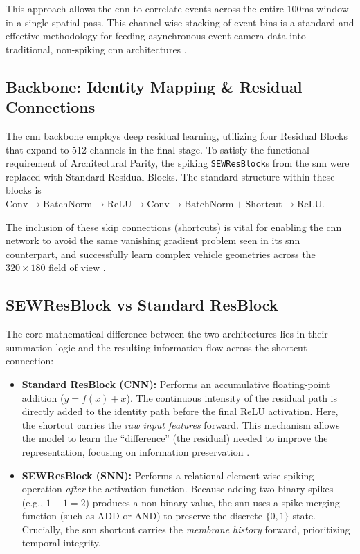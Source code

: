 This approach allows the \gls{cnn} to correlate events across the entire 100ms window in a single spatial pass. This channel-wise stacking of event bins is a standard and effective methodology for feeding asynchronous event-camera data into traditional, non-spiking \gls{cnn} architectures \cite{gehrig2019}.

\subsection{Backbone: Identity Mapping \& Residual Connections}
\label{subsec:cnn_backbone}

The \gls{cnn} backbone employs deep residual learning, utilizing four Residual Blocks that expand to 512 channels in the final stage. 
To satisfy the functional requirement of Architectural Parity, the spiking \texttt{SEWResBlock}s from the \gls{snn} were replaced with Standard Residual Blocks. 
The standard structure within these blocks is $\text{Conv} \rightarrow \text{BatchNorm} \rightarrow \text{ReLU} \rightarrow \text{Conv} \rightarrow \text{BatchNorm} + \text{Shortcut} \rightarrow \text{ReLU}$. 

The inclusion of these skip connections (shortcuts) is vital for enabling the \gls{cnn} network to avoid the same vanishing gradient problem seen in its \gls{snn} counterpart, and successfully learn complex vehicle geometries across the $320 \times 180$ field of view \cite{he2015deep}.

\subsection{SEWResBlock vs Standard ResBlock}
The core mathematical difference between the two architectures lies in their summation logic and the resulting information flow across the shortcut connection:

\begin{itemize}
    \item \textbf{Standard ResBlock (CNN):} 
    Performs an accumulative floating-point addition ($y = f(x) + x$). 
    The continuous intensity of the residual path is directly added to the identity path before the final ReLU activation. 
    Here, the shortcut carries the \textit{raw input features} forward. 
    This mechanism allows the model to learn the ``difference'' (the residual) needed to improve the representation, focusing on information preservation \cite{he2015deep}.
    
    \item \textbf{SEWResBlock (SNN):} 
    Performs a relational element-wise spiking operation \textit{after} the activation function. 
    Because adding two binary spikes (e.g., $1+1=2$) produces a non-binary value, the \gls{snn} uses a spike-merging function (such as ADD or AND) to preserve the discrete $\{0, 1\}$ state. 
    Crucially, the \gls{snn} shortcut carries the \textit{membrane history} forward, prioritizing temporal integrity.

\end{itemize}

